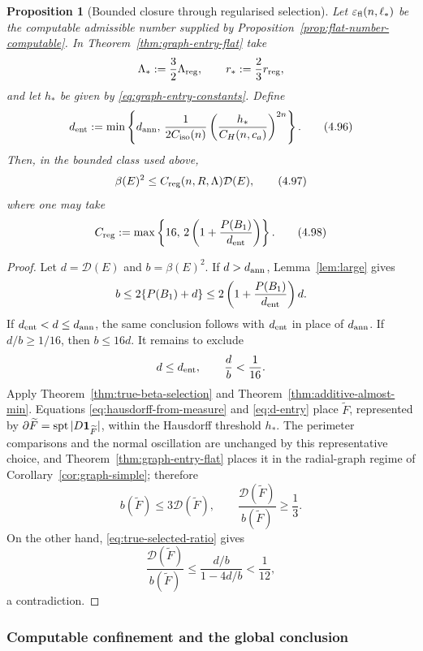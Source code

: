 \documentclass[11pt]{amsart}
\newtheorem{proposition}[theorem]{Proposition}
\theoremstyle{definition}
\newcommand{\Per}{P}
\newcommand{\Def}{\mathcal D}
\begin{document}
\begin{proposition}[Bounded closure through regularised selection]
\label{prop:true-beta-bounded-close}
Let \(\varepsilon_{\rm fl}(n,\ell_*)\) be the computable admissible
number supplied by Proposition~\ref{prop:flat-number-computable}.  In
Theorem~\ref{thm:graph-entry-flat} take
\[
   \Lambda_*:=\frac32\Lambda_{\rm reg},\qquad
   r_*:=\frac23r_{\rm reg},
\]
and let \(h_*\) be given by \eqref{eq:graph-entry-constants}.  Define
\[
   d_{\rm ent}:=\min\left\{d_{\rm ann},\,
      \frac{1}{2C_{\rm iso}(n)}
      \left(\frac{h_*}{C_H(n,c_a)}\right)^{2n}\right\}.
\tag{4.96}\label{eq:d-entry}
\]
Then, in the bounded class used above,
\[
   \beta(E)^2\le C_{\rm reg}(n,R,\Lambda)\Def(E),
\tag{4.97}\label{eq:regularised-bounded-FJ}
\]
where one may take
\[
   C_{\rm reg}
   :=
   \max\left\{16,\,
       2\left(1+\frac{\Per(B_1)}{d_{\rm ent}}\right)\right\}.
\tag{4.98}\label{eq:Creg}
\]
\end{proposition}

\begin{proof}
Let \(d=\Def(E)\) and \(b=\beta(E)^2\).  If \(d>d_{\rm ann}\),
Lemma~\ref{lem:large} gives
\[
   b\le2\{\Per(B_1)+d\}
     \le2\left(1+\frac{\Per(B_1)}{d_{\rm ent}}\right)d.
\]
If \(d_{\rm ent}<d\le d_{\rm ann}\), the same conclusion follows with
\(d_{\rm ent}\) in place of \(d_{\rm ann}\).
If \(d/b\ge1/16\), then \(b\le16d\).  It remains to exclude
\[
   d\le d_{\rm ent},\qquad \frac d b<\frac1{16}.
\]
Apply Theorem~\ref{thm:true-beta-selection} and
Theorem~\ref{thm:additive-almost-min}.  Equations
\eqref{eq:hausdorff-from-measure} and \eqref{eq:d-entry} place
\(\widetilde F\), represented by
\(\partial\widetilde F=\operatorname{spt}|D{\bf1}_{\widetilde F}|\),
within the Hausdorff threshold \(h_*\).  The perimeter comparisons and
the normal oscillation are unchanged by this representative choice, and
Theorem~\ref{thm:graph-entry-flat} places it in the radial-graph regime of
Corollary~\ref{cor:graph-simple}; therefore
\[
   b(\widetilde F)\le3\Def(\widetilde F),
   \qquad
   \frac{\Def(\widetilde F)}{b(\widetilde F)}\ge\frac13.
\]
On the other hand, \eqref{eq:true-selected-ratio} gives
\[
   \frac{\Def(\widetilde F)}{b(\widetilde F)}
   \le\frac{d/b}{1-4d/b}<\frac1{12},
\]
a contradiction.
\end{proof}

\subsubsection{Computable confinement and the global conclusion}
\end{document}
